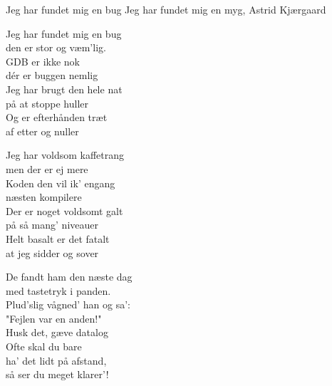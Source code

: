 \begin{song}{Jeg har fundet mig en bug}
  {} %
  {Jeg har fundet mig en myg, Astrid Kjærgaard} %
  {} %
  {} %
  {\NotCCLIed} %

  \begin{SBVerse}
    Jeg har fundet mig en bug\\
    den er stor og væm’lig.\\
    GDB er ikke nok\\
    dér er buggen nemlig\\\medskip
    Jeg har brugt den hele nat\\
    på at stoppe huller\\
    Og er efterhånden træt\\
    af etter og nuller
  \end{SBVerse}

  \begin{SBVerse}
    Jeg har voldsom kaffetrang\\
    men der er ej mere\\
    Koden den vil ik’ engang\\
    næsten kompilere\\\medskip
    Der er noget voldsomt galt\\
    på så mang’ niveauer\\
    Helt basalt er det fatalt\\
    at jeg sidder og sover
  \end{SBVerse}

  \begin{SBVerse}
    De fandt ham den næste dag\\
    med tastetryk i panden.\\
    Plud’slig vågned’ han og sa’:\\
    "Fejlen var en anden!"\\\medskip
    Husk det, gæve datalog\\
    Ofte skal du bare\\
    ha’ det lidt på afstand,\\
    så ser du meget klarer’!
  \end{SBVerse}
\end{song}